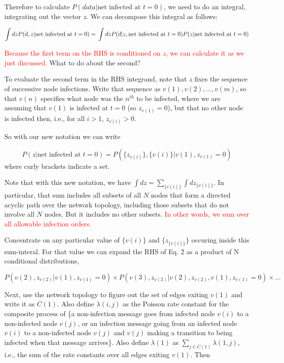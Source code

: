 \documentclass{article}
\begin{document}
	Therefore to calculate $P(data  | \text{net infected at } t = 0)$, we need to do an
	integral, integrating out the vector $z$. We can
	decompose this integral as follows:

	\begin{equation}
	   \int dz P(d, z | \text{net infected at } t = 0) = \\
       	\int dz P(d | z, \text{net infected at } t = 0) P(z | \text{net infected at } t=0)
	\end{equation}
	
	\textcolor{red}{Because the first term on the RHS is conditioned on $z$, we can 
	calculate it as we just discussed.} What to do about the second?

	To evaluate the second term in the RHS integrand, note that $z$ fixes
	the sequence of successive node infections. Write that sequence as
	$v(1), v(2), \ldots, v(m)$, so that $v(n)$ specifies what node was the $n^{th}$
	to be infected, where we are assuming that $v(1)$ is infected at $t = 0$ (so
	$z_{v(1)} = 0$), but that no other node is infected then, i.e., for all 
	$i > 1$, $z_{v(i)} > 0$.

	So with our new notation we can write

	\begin{equation}
	 P(z | \text{net infected at } t = 0) = P(\{z_{v(i)}\}, \{v(i)\} | v(1), z_{v(1)} = 0)
	\end{equation}
	where curly brackets indicate a set. 

	Note that with this new notation, we have $\int dz = \sum_{\{v(i)\}} \int dz_{\{v(i)\}}$.
	In particular, that sum includes all subsets of all $N$ nodes that form a directed 
        acyclic path over the network topology, including those subsets that do not involve all $N$
	nodes. But it includes no other subsets.  \textcolor{red}{In other words, we sum over all allowable infection 
        orders.}

	Concentrate on any particular value of $\{v(i)\}$ and $\{z_{\{v(i)\}}\}$ occuring
	inside this sum-interal. For that value we can expand the RHS of Eq. 2
	as a product of N conditional distributions,

	\begin{equation*}
		P(v(2), z_{v(2)} |  v(1), z_{v(1)} = 0)    \times  
		P(v(3), z_{v(3)} |  v(2), z_{v(2)}, v(1), z_{v(1)} = 0)    \times  \ldots
	\end{equation*}

	Next, use the network topology to figure out the set of edges exiting
	$v(1)$ and write it as $C(1)$. Also define $\lambda(i,j)$ as the Poisson rate
	constant for the composite process of \{a non-infection message goes
	from infected node $v(i)$ to a non-infected node $v(j)$, or an infection
	message going from an infected node $v(i)$ to a non-infected node $v(j)$
	and $v(j)$ making a transition to being infected when that message
	arrives\}.  Also define $\lambda(1)$ as $\sum_{j \in C(1)} \lambda(1,j)$,
	i.e., the sum of the rate constants over all edges exiting $v(1)$. Then
\end{document}
